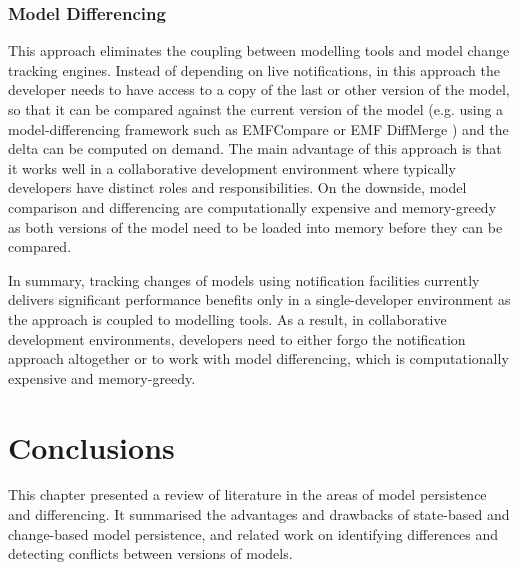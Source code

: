 \subsubsection{Model Differencing}
\label{sec:model_differencing}
  This approach eliminates the coupling between 
modelling tools and model change tracking engines. Instead of depending on 
live notifications, in this approach the developer needs to have access to a copy of the last or other version of the model, so that it can be compared against the current version of 
the model (e.g. using a model-differencing framework such as
EMFCompare\cite{emfcompare2018developer} or EMF DiffMerge \cite{eclipse2019emfdiffmerge}) and the delta can be computed on demand. The main advantage of 
this approach is that it works well in a collaborative development environment 
where typically developers have distinct roles and responsibilities. On the 
downside, model comparison and differencing are computationally expensive and 
memory-greedy as both versions of the model need to be loaded into memory before they can be compared.

In summary, tracking changes of models using notification facilities currently delivers significant performance benefits only in a single-developer environment as the approach is coupled to modelling tools. 
As a result, in collaborative development environments, 
developers need to either forgo the notification approach altogether 
or to work with model differencing, which is computationally expensive and 
memory-greedy.



\section{Conclusions}
\label{sec:conclusions_2}
This chapter presented a review of literature in the areas of model persistence and differencing. It summarised the advantages and drawbacks of state-based and change-based model persistence, and related work on identifying differences and detecting conflicts between versions of models.